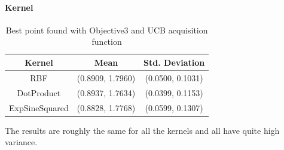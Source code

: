 \paragraph*{Kernel}
\begin{table}[H]
    \centering
    \begin{tabular}{|c|c|c|}
        \textbf{Kernel} & \textbf{Mean}  & \textbf{Std. Deviation} \\\hline
        RBF             & (0.8909, 1.7960) & (0.0500, 0.1031)          \\
        DotProduct      & (0.8937, 1.7634) & (0.0399, 0.1153)          \\
        ExpSineSquared  & (0.8828, 1.7768) & (0.0599, 0.1307)          \\
        \hline
    \end{tabular}
    \caption{Best point found with Objective3 and UCB acquisition function}
    \label{tab:kernel}
\end{table}
The results are roughly the same for all the kernels and all have quite high variance.


